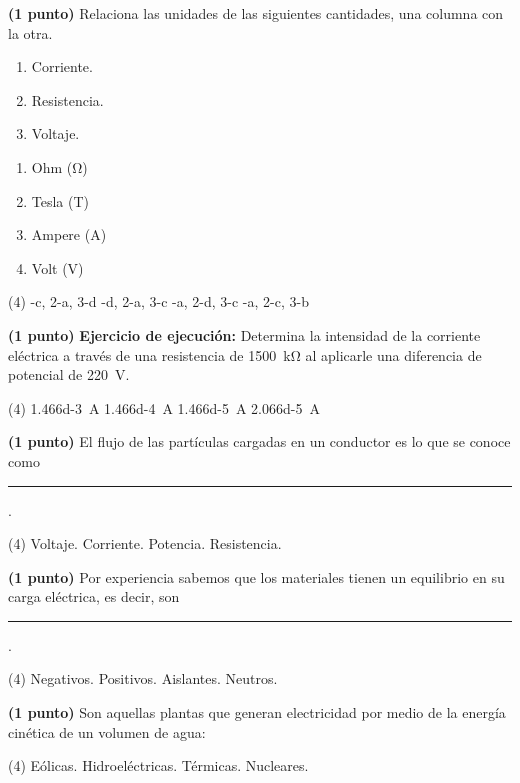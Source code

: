\documentclass[12pt, letter]{exam}
\begin{document}
\begin{questions}
    \question \textbf{(1 punto)} Relaciona las unidades de las siguientes cantidades, una columna con la otra.
    \\
    \begin{minipage}[t]{0.4\linewidth}
        \begin{enumerate}[label=\arabic*)]
            \item Corriente.
            \item Resistencia.
            \item Voltaje.
        \end{enumerate}
    \end{minipage}
    \begin{minipage}[t]{0.4\linewidth}
        \begin{enumerate}[label=\alph*)]
            \item Ohm (\si{\ohm})
            \item Tesla (T)
            \item Ampere (\si{\ampere})
            \item Volt (\si{\volt})
        \end{enumerate}
    \end{minipage}
    \begin{tasks}(4)
        -c, 2-a, 3-d
        -d, 2-a, 3-c
        -a, 2-d, 3-c
        -a, 2-c, 3-b
    \end{tasks}
    \question \textbf{(1 punto)} \label{Problema_02} \textbf{Ejercicio de ejecución: } Determina la intensidad de la corriente eléctrica a través de una resistencia de \SI{1500}{\kilo\ohm} al aplicarle una diferencia de potencial de \SI{220}{\volt}.
    \begin{tasks}(4)
        \task \SI{1.466d-3}{\ampere}
        \task \SI{1.466d-4}{\ampere}
        \task \SI{1.466d-5}{\ampere}
        \task \SI{2.066d-5}{\ampere}
    \end{tasks}
    \question \textbf{(1 punto)} El flujo de las partículas cargadas en un conductor es lo que se conoce como \rule{2cm}{0.1mm}.
    \begin{tasks}(4)
        \task Voltaje.
        \task Corriente.
        \task Potencia.
        \task Resistencia.
    \end{tasks}
    \question \textbf{(1 punto)} Por experiencia sabemos que los materiales tienen un equilibrio en su carga eléctrica, es decir, son \rule{2cm}{0.1mm}.
    \begin{tasks}(4)
        \task Negativos.
        \task Positivos.
        \task Aislantes.
        \task Neutros.
    \end{tasks}
    \question \textbf{(1 punto)} Son aquellas plantas que generan electricidad por medio de la energía cinética de un volumen de agua:
    \begin{tasks}(4)
        \task Eólicas.
        \task Hidroeléctricas.
        \task Térmicas.
        \task Nucleares.
    \end{tasks}


\end{questions}
\end{document}
